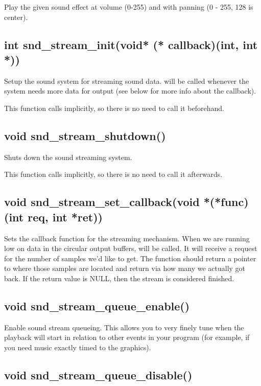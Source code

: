 \documentclass[english]{report}
\begin{document}
Play the given sound effect at volume  (0-255) and with
panning  (0 - 255, 128 is center).

\subsection{int snd\_stream\_init(void* (* callback)(int, int *))}

Setup the sound system for streaming sound data.  will be
called whenever the system needs more data for output (see below for more
info about the callback).

This function calls  implicitly, so there is no need
to call it beforehand.

\subsection{void snd\_stream\_shutdown()}

Shuts down the sound streaming system.

This function calls  implicitly, so there is no need
to call it afterwards.

\subsection{void snd\_stream\_set\_callback(void *(*func)(int req, int *ret))}

Sets the callback function for the streaming mechanism. When we are running low on
data in the circular output buffers,  will be called. It will
receive a request for the number of samples we'd like to get. The function
should return a pointer to where those samples are located and return
via  how many we actually got back. If
the return value is NULL, then the stream is considered finished.

\subsection{void snd\_stream\_queue\_enable()}

Enable sound stream queueing. This allows you to very finely tune when the
playback will start in relation to other events in your program (for example,
if you need music exactly timed to the graphics).

\subsection{void snd\_stream\_queue\_disable()}
\end{document}
